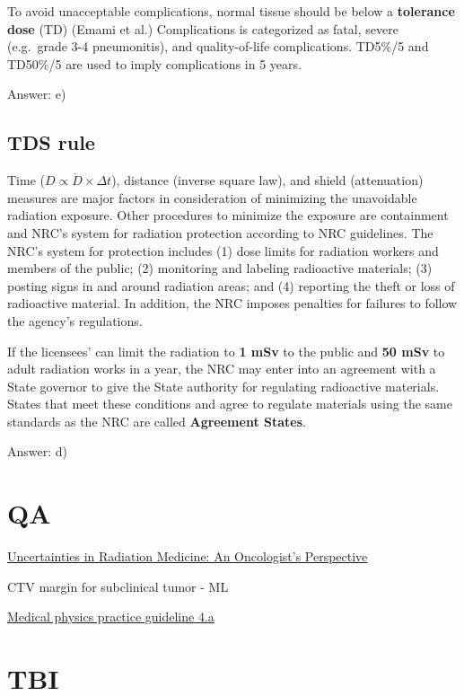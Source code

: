 \documentclass[]{book}
\theoremstyle{definition}
\theoremstyle{definition}
\theoremstyle{definition}
\theoremstyle{remark}
\begin{document}
To avoid unacceptable complications, normal tissue should be below a
\textbf{tolerance dose} (TD) (Emami et al.) Complications is categorized
as fatal, severe (e.g.~grade 3-4 pneumonitis), and quality-of-life
complications. TD5\%/5 and TD50\%/5 are used to imply complications in 5
years.

Answer: e)

\section{TDS rule}\label{tds-rule}

Time (\(D \propto \dot{D}\times \Delta t\)), distance (inverse square
law), and shield (attenuation) measures are major factors in
consideration of minimizing the unavoidable radiation exposure. Other
procedures to minimize the exposure are containment and NRC's system for
radiation protection according to NRC guidelines. The NRC's system for
protection includes (1) dose limits for radiation workers and members of
the public; (2) monitoring and labeling radioactive materials; (3)
posting signs in and around radiation areas; and (4) reporting the theft
or loss of radioactive material. In addition, the NRC imposes penalties
for failures to follow the agency's regulations.

If the licensees' can limit the radiation to \textbf{1 mSv} to the
public and \textbf{50 mSv} to adult radiation works in a year, the NRC
may enter into an agreement with a State governor to give the State
authority for regulating radioactive materials. States that meet these
conditions and agree to regulate materials using the same standards as
the NRC are called \textbf{Agreement States}.

Answer: d)

\chapter{QA}\label{qa}

\href{https://vimeo.com/76862861}{Uncertainties in Radiation Medicine:
An Oncologist's Perspective}

CTV margin for subclinical tumor - ML

\href{https://aapm.onlinelibrary.wiley.com/doi/full/10.1120/jacmp.v16i3.5431}{Medical
physics practice guideline 4.a}

\chapter{TBI}\label{tbi}
\end{document}
